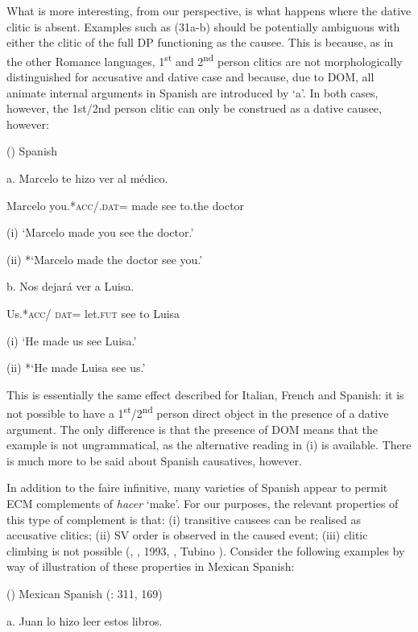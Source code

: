 \documentclass[output=paper,modfonts,nonflat]{langsci/langscibook}
\begin{document}
What is more interesting, from our perspective, is what happens where the dative clitic is absent. Examples such as (31a-b) should be potentially ambiguous with either the clitic of the full DP functioning as the causee. This is because, as in the other Romance languages, 1\textsuperscript{st} and 2\textsuperscript{nd} person clitics are not morphologically distinguished for accusative and dative case and because, due to DOM, all animate internal arguments in Spanish are introduced by ‘a’.  In both cases, however, the 1st/2nd person clitic can only be construed as a dative causee, however:

()  Spanish

a.   Marcelo   te     hizo     ver   al   médico.

  Marcelo   you.*\textsc{acc/.dat=}  made  see     to.the   doctor

  (i) ‘Marcelo made you see the doctor.’

  (ii) *‘Marcelo made the doctor see you.’

b.   Nos     dejará   ver   a   Luisa.

  Us.*\textsc{acc/} \textsc{dat=}   let.\textsc{fut}  see   to   Luisa

  (i) ‘He made us see Luisa.’

  (ii) *‘He made Luisa see us.’

This is essentially the same effect described for Italian, French and Spanish: it is not possible to have a 1\textsuperscript{st}/2\textsuperscript{nd} person direct object in the presence of a dative argument. The only difference is that the presence of DOM means that the example is not ungrammatical, as the alternative reading in (i) is available. There is much more to be said about Spanish causatives, however. 

In addition to the faire infinitive, many varieties of Spanish appear to permit ECM complements of \textit{hacer} ‘make’. For our purposes, the relevant properties of this type of complement is that: (i) transitive causees can be realised as accusative clitics; (ii) SV order is observed in the caused event; (iii) clitic climbing is not possible (\citealt{Strozer1976}, \citealt{Treviño1992}, 1993, \citealt{Torrego2010}, Tubino \citealt{Blanco2011}). Consider the following examples by way of illustration of these properties in Mexican Spanish:

()  Mexican Spanish (\citealt{Treviño1992}: 311, 169)

a.   Juan lo     hizo   leer   estos libros.     
\end{document}
